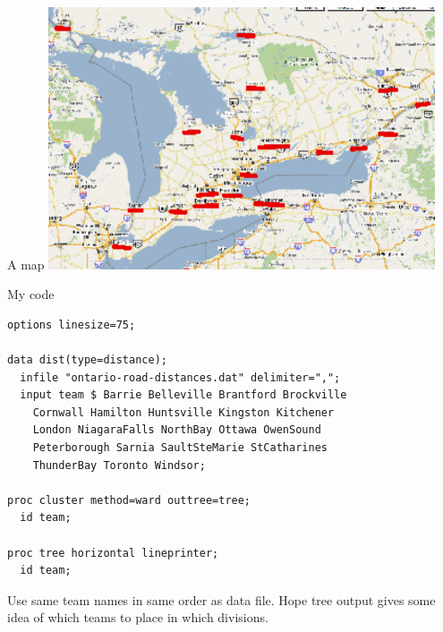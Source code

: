 \documentclass[pdf]{prosper}
\begin{document}
\begin{slide}{A map}
\includegraphics[width=4.5in]{ontario2}
  \end{slide}

\begin{slide}{My code}

\begin{verbatim}
options linesize=75;

data dist(type=distance);
  infile "ontario-road-distances.dat" delimiter=",";
  input team $ Barrie Belleville Brantford Brockville 
    Cornwall Hamilton Huntsville Kingston Kitchener 
    London NiagaraFalls NorthBay Ottawa OwenSound 
    Peterborough Sarnia SaultSteMarie StCatharines 
    ThunderBay Toronto Windsor;

proc cluster method=ward outtree=tree;
  id team;

proc tree horizontal lineprinter;
  id team;
\end{verbatim}

Use same team names in same order as data file. Hope tree output gives some idea of which teams to place in which divisions.
  
\end{slide}
\end{document}
